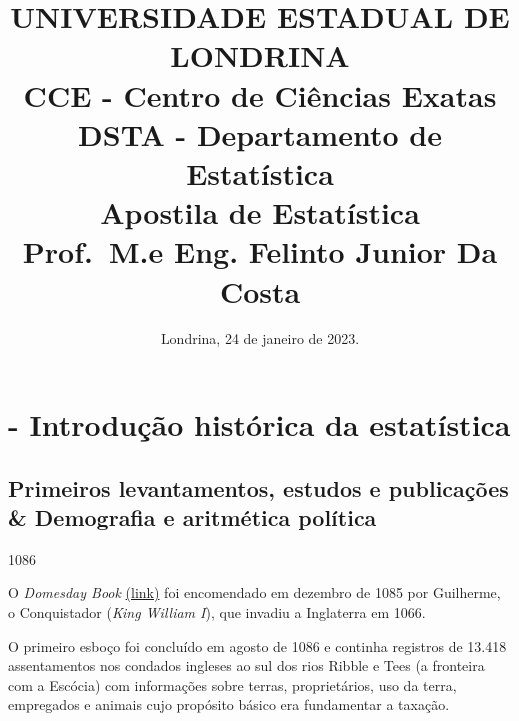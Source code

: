 \documentclass[
]{book}
\title{UNIVERSIDADE ESTADUAL DE LONDRINA\\
CCE - Centro de Ciências Exatas\\
DSTA - Departamento de Estatística\\
Apostila de Estatística\\
Prof.~M.e Eng. Felinto Junior Da Costa}
\author{}
\date{\vspace{-2.5em}Londrina, 24 de janeiro de 2023.}
\begin{document}
\maketitle

{
\setcounter{tocdepth}{1}
\tableofcontents
}
\hypertarget{section}{%
\chapter*{}\label{section}}

\hypertarget{historia}{%
\chapter{- Introdução histórica da estatística}\label{historia}}

\hypertarget{primeiros-levantamentos-estudos-e-publicauxe7uxf5es-demografia-e-aritmuxe9tica-poluxedtica}{%
\section{Primeiros levantamentos, estudos e publicações \& Demografia e aritmética política}\label{primeiros-levantamentos-estudos-e-publicauxe7uxf5es-demografia-e-aritmuxe9tica-poluxedtica}}

1086

\hfill\break

O \emph{Domesday Book} \href{http://www.nationalarchives.gov.uk/education/resources/domesday-book/}{(link)}
foi encomendado em dezembro de 1085 por Guilherme, o Conquistador (\emph{King William I}), que invadiu a Inglaterra em 1066.

O primeiro esboço foi concluído em agosto de 1086 e continha registros de 13.418 assentamentos nos condados ingleses ao sul dos rios Ribble e Tees (a fronteira com a Escócia) com informações sobre terras, proprietários, uso da terra, empregados e animais cujo propósito básico era fundamentar a taxação.

\hfill\break
\end{document}
